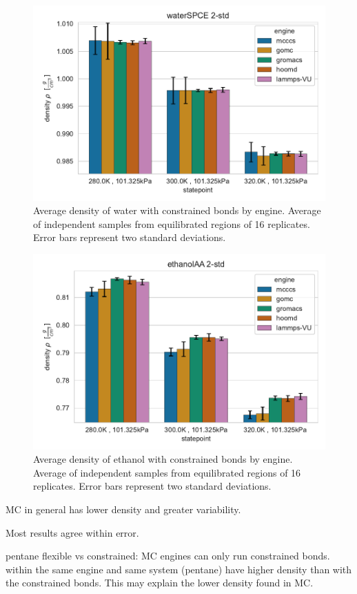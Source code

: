 \begin{figure}[h!]
    \centering
    \includegraphics[width=0.8\linewidth,keepaspectratio]{figures/rep_study/waterSPCE_summary_bar_2std.pdf}
    \caption{Average density of water with constrained bonds by engine. Average of independent samples from equilibrated regions of 16 replicates. Error bars represent two standard deviations.}\label{fig:water_density}
\end{figure}

\begin{figure}[h!]
    \centering
    \includegraphics[width=0.8\linewidth,keepaspectratio]{figures/rep_study/ethanolAA_summary_bar_2std.pdf}
    \caption{Average density of ethanol with constrained bonds by engine. Average of independent samples from equilibrated regions of 16 replicates. Error bars represent two standard deviations.}\label{fig:ethanol_density}
\end{figure}

MC in general has lower density and greater variability.

Most results agree within error.

pentane flexible vs constrained: MC engines can only run constrained bonds. within the same engine and same system (pentane) have higher density than with the constrained bonds. This may explain the lower density found in MC.

